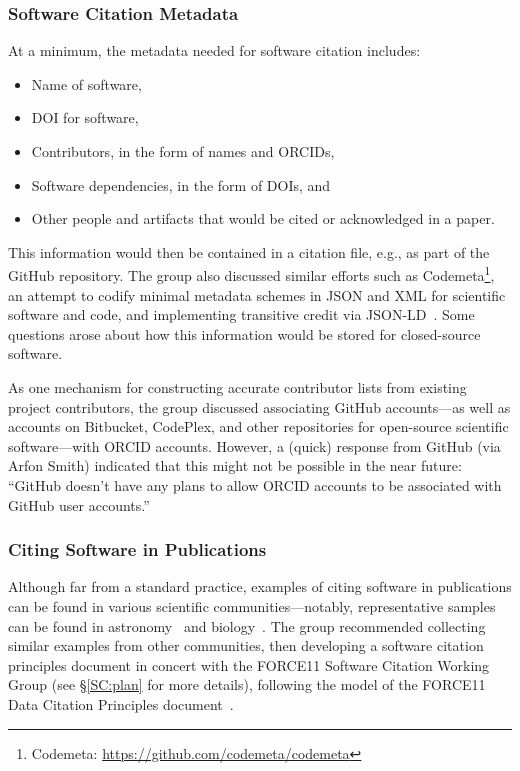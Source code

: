 \subsubsection{Software Citation Metadata}

At a minimum, the metadata needed for software citation %
includes:
\begin{itemize}
    \item Name of software,
    \item DOI for software,
    \item Contributors, in the form of names and ORCIDs,
    \item Software dependencies, in the form of DOIs, and
    \item Other people and artifacts that would be cited or acknowledged in a paper.
\end{itemize}
This information would then be contained in a citation file, e.g., as part of
the GitHub repository. The group also discussed similar efforts such as
Codemeta\footnote{Codemeta: \url{https://github.com/codemeta/codemeta}}, an
attempt to codify minimal metadata schemes in JSON and XML for scientific
software and code, and implementing transitive credit via
JSON-LD~\cite{wssspe2_katz}. Some questions arose about how this information
would be stored for closed-source software.

As one mechanism for constructing accurate contributor lists from existing
project contributors, the group discussed associating GitHub accounts---as well
as accounts on Bitbucket, CodePlex, and other repositories for open-source
scientific software---with ORCID accounts. However, a (quick) response from
GitHub (via Arfon Smith) indicated that this might not be possible in the near
future: ``GitHub doesn't have any plans to allow ORCID accounts to be associated
with GitHub user accounts.''

\subsubsection{Citing Software in Publications}

Although far from a standard practice, examples of citing software in
publications can be found in various scientific communities---notably,
representative samples can be found in astronomy~\cite{astronomy_SW_examples}
and biology~\cite{Howison2015}. The group recommended collecting similar
examples from other communities, then developing a software citation principles
document in concert with the FORCE11 Software Citation Working Group (see
\S\ref{SC:plan} for more details), following the model of the FORCE11 Data
Citation Principles document~\cite{DataCitation2014}.


